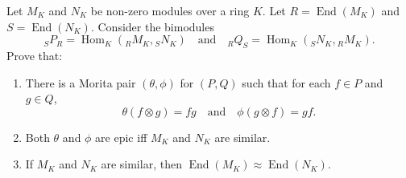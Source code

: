 Let $M_K$ and $N_K$ be non-zero modules over a ring $K$. Let $R = \operatorname{End}(M_K)$ and $S = \operatorname{End}(N_K)$. Consider the bimodules
$${}_S P_R = \operatorname{Hom}_K({}_R M_K, {}_S N_K) \quad \text{and} \quad {}_R Q_S = \operatorname{Hom}_K({}_S N_K, {}_R M_K).$$
Prove that:
\begin{enumerate}
    \item[(1)] There is a Morita pair $(\theta, \phi)$ for $(P, Q)$ such that for each $f \in P$ and $g \in Q$,
    $$\theta(f \otimes g) = fg \quad \text{and} \quad \phi(g \otimes f) = gf.$$
    \item[(2)] Both $\theta$ and $\phi$ are epic iff $M_K$ and $N_K$ are similar.
    \item[(3)] If $M_K$ and $N_K$ are similar, then $\operatorname{End}(M_K) \approx \operatorname{End}(N_K)$.
\end{enumerate}
